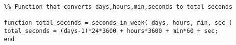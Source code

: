 \begin{verbatim}
%% Function that converts days,hours,min,seconds to total seconds

function total_seconds = seconds_in_week( days, hours, min, sec )
total_seconds = (days-1)*24*3600 + hours*3600 + min*60 + sec;
end
\end{verbatim}

